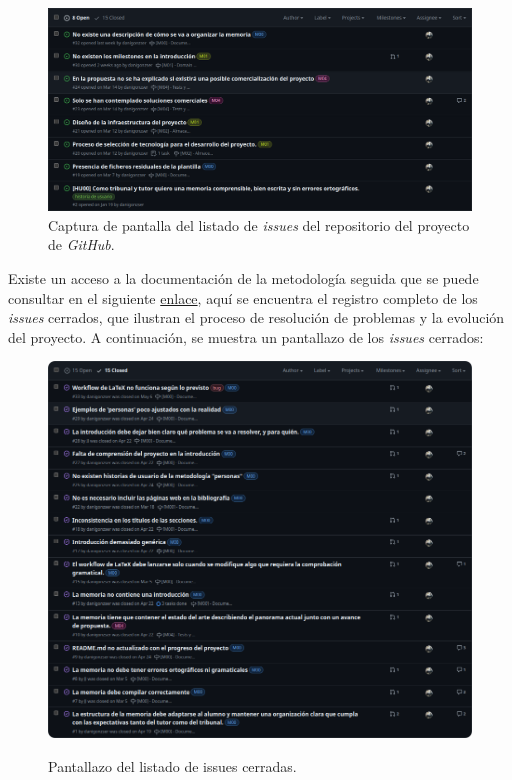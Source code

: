 \begin{figure}[H]
    \caption{Captura de pantalla del listado de \textit{issues} del repositorio del proyecto de \textit{GitHub}.}
    \centering
    \vspace*{0.5cm}
    \includegraphics[scale=0.2]{figuras/github_issues.png}
\end{figure}

Existe un acceso a la documentación de la metodología seguida que se puede consultar en el siguiente \href{https://github.com/danigonzser/proyecto-tfg/issues?q=is%3Aissue+is%3Aclosed}{enlace}, aquí se encuentra el registro completo de los \textit{issues} cerrados, que ilustran el proceso de resolución de problemas y la evolución del proyecto. A continuación, se muestra un pantallazo de los \textit{issues} cerrados:

\begin{figure}[H]
    \caption{Pantallazo del listado de issues cerradas.}
    \centering
    \vspace*{0.5cm}
    \includegraphics[scale=0.2]{figuras/listado_issues_cerradas.png}\label{fig:figuras/listado_issues_cerradas.png}
\end{figure}

